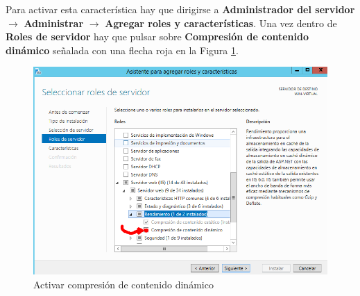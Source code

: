 Para activar esta característica hay que dirigirse a \textbf{Administrador del servidor} $ \rightarrow $ \textbf{Administrar} $ \rightarrow $ \textbf{Agregar roles y características}.
Una vez dentro de \textbf{Roles de servidor} hay que pulsar sobre \textbf{Compresión de contenido dinámico} señalada con una flecha roja en la Figura \ref{fig:figura5-1}.
	\begin{figure}[H] %
		\centering
		\includegraphics[scale=0.67]{figuras/ejercicio5/figura5-1.png} 
		\caption{Activar compresión de contenido dinámico} 
		\label{fig:figura5-1}
	\end{figure}

